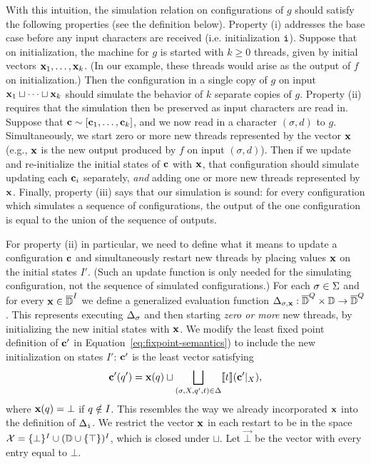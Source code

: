With this intuition, the simulation relation on configurations of $g$ should satisfy the following properties (see the definition below). Property (i) addresses the base case before any input characters are received (i.e. initialization ${\texttt{i}}$). Suppose that on initialization, the machine for $g$ is started with $k \ge 0$ threads, given by initial vectors $\textbf{x}_1, \ldots, \textbf{x}_k$. (In our example, these threads would arise as the output of $f$ on initialization.) Then the configuration in a single copy of $g$ on input $\textbf{x}_1 \sqcup \cdots \sqcup \textbf{x}_k$ should simulate the behavior of $k$ separate copies of $g$. Property (ii) requires that the simulation then be preserved as input characters are read in. Suppose that $\textbf{c} \sim [\textbf{c}_1, \ldots, \textbf{c}_k]$, and we now read in a character $(\sigma,d)$ to $g$. Simultaneously, we start zero or more new threads represented by the vector $\textbf{x}$ (e.g., $\textbf{x}$ is the new output produced by $f$ on input $(\sigma, d)$). Then if we update and re-initialize the initial states of $\textbf{c}$ with $\textbf{x}$, that configuration should simulate updating each $\textbf{c}_i$ separately, \emph{and} adding one or more new threads represented by $\textbf{x}$. Finally, property (iii) says that our simulation is sound: for every configuration which simulates a sequence of configurations, the output of the one configuration is equal to the union of the sequence of outputs.

For property (ii) in particular, we need to define what it means to update a configuration $\textbf{c}$ and simultaneously restart new threads by placing values $\textbf{x}$ on the initial states $I'$. (Such an update function is only needed for the simulating configuration, not the sequence of simulated configurations.) For each $\sigma \in \Sigma$ and for every $\textbf{x} \in \overline{\mathbb{D}{}}^I$ we define a generalized evaluation function $\Delta_{\sigma,\textbf{x}}: \overline{\mathbb{D}{}}^Q \times \mathbb{D} \to \overline{\mathbb{D}{}}^Q$. This represents executing $\Delta_\sigma$ and then starting \emph{zero or more} new threads, by initializing the new initial states with $\textbf{x}$. We modify the least fixed point definition of $\textbf{c}'$ in Equation~\ref{eq:fixpoint-semantics}) to include the new initialization on states $I'$: $\textbf{c}'$ is the least vector satisfying
\[
\textbf{c}'(q') = \textbf{x}(q) \sqcup \bigsqcup_{(\sigma, X, q', t) \in \Delta} \llbracket t \rrbracket(\textbf{c}'|_X),
\]
where $\textbf{x}(q) = \bot$ if $q \notin I$. This resembles the way we already incorporated $\textbf{x}$ into the definition of $\Delta_{\texttt{i}}$.
We restrict the vector $\textbf{x}$ in each restart to be in the space $\mathcal{X} = \{\bot\}^I \cup (\mathbb{D} \cup \{\top\})^I$, which is closed under $\sqcup$.
Let $\vec{\bot}$ be the vector with every entry equal to $\bot$.

